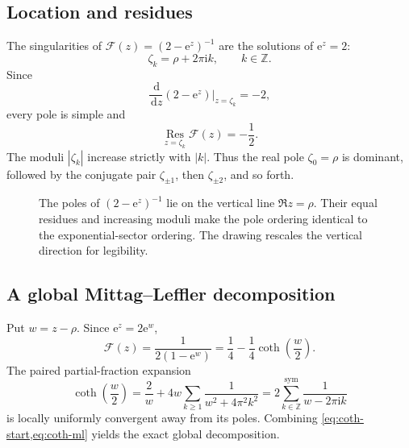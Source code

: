 \documentclass[11pt,a4paper,oneside]{article}
\theoremstyle{definition}
\theoremstyle{remark}
\newcommand{\Res}{\operatorname*{Res}}
\newcommand{\e}{\mathrm{e}}
\newcommand{\ii}{\mathrm{i}}
\newcommand{\dd}{\,\mathrm{d}}
\begin{document}
\subsection{Location and residues}
The singularities of $\mathcal F(z)=(2-\e^z)^{-1}$ are the solutions of
$\e^z=2$:
\[
 \zeta_k=\rho+2\pi\ii k,\qquad k\in\mathbb Z.
\]
Since
\[
 \frac{\dd}{\dd z}(2-\e^z)\bigg|_{z=\zeta_k}=-2,
\]
every pole is simple and
\begin{equation}\label{eq:residue}
 \Res_{z=\zeta_k}\mathcal F(z)=-\frac12.
\end{equation}
The moduli $|\zeta_k|$ increase strictly with $|k|$.  Thus the real pole
$\zeta_0=\rho$ is dominant, followed by the conjugate pair
$\zeta_{\pm1}$, then $\zeta_{\pm2}$, and so forth.

\begin{figure}[htbp]
\centering
{}
\caption{The poles of $(2-\e^z)^{-1}$ lie on the vertical line
$\Re z=\rho$.  Their equal residues and increasing moduli make the pole
ordering identical to the exponential-sector ordering.  The drawing rescales
the vertical direction for legibility.}
\label{fig:pole-lattice}
\end{figure}

\subsection{A global Mittag--Leffler decomposition}
Put $w=z-\rho$.  Since $\e^z=2\e^w$,
\begin{equation}\label{eq:coth-start}
 \mathcal F(z)=\frac{1}{2(1-\e^w)}
 =\frac14-\frac14\coth\!\left(\frac w2\right).
\end{equation}
The paired partial-fraction expansion
\begin{equation}\label{eq:coth-ml}
 \coth\!\left(\frac w2\right)
 =\frac{2}{w}+4w\sum_{k\ge1}\frac{1}{w^2+4\pi^2k^2}
 =2\sum_{k\in\mathbb Z}^{\mathrm{sym}}\frac{1}{w-2\pi\ii k}
\end{equation}
is locally uniformly convergent away from its poles.  Combining
\cref{eq:coth-start,eq:coth-ml} yields the exact global decomposition.
\end{document}
